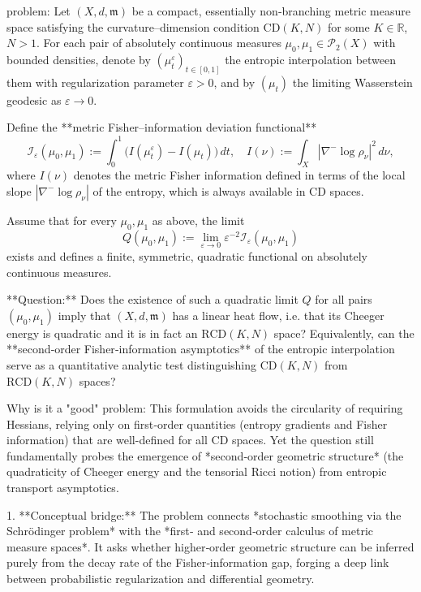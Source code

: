 problem:  
Let \((X,d,\mathfrak{m})\) be a compact, essentially non‑branching metric measure space satisfying the curvature–dimension condition \(\mathrm{CD}(K,N)\) for some \(K\in\mathbb{R}\), \(N>1\).  
For each pair of absolutely continuous measures \(\mu_0,\mu_1\in\mathcal P_2(X)\) with bounded densities, denote by \((\mu_t^\varepsilon)_{t\in[0,1]}\) the entropic interpolation between them with regularization parameter \(\varepsilon>0\), and by \((\mu_t)\) the limiting Wasserstein geodesic as \(\varepsilon\to 0\).  

Define the **metric Fisher–information deviation functional**  
\[
\mathcal{I}_\varepsilon(\mu_0,\mu_1)
:= \int_0^1\!\!\Big(
I(\mu_t^\varepsilon) - I(\mu_t)
\Big)\,dt,
\quad 
I(\nu):=\int_X |\nabla^- \log\rho_\nu|^2\,d\nu,
\]
where \(I(\nu)\) denotes the metric Fisher information defined in terms of the local slope \(|\nabla^- \log\rho_\nu|\) of the entropy, which is always available in CD spaces.  

Assume that for every \(\mu_0,\mu_1\) as above, the limit  
\[
Q(\mu_0,\mu_1):=\lim_{\varepsilon\to0}\varepsilon^{-2}\mathcal{I}_\varepsilon(\mu_0,\mu_1)
\]
exists and defines a finite, symmetric, quadratic functional on absolutely continuous measures.  

**Question:**  
Does the existence of such a quadratic limit \(Q\) for all pairs \((\mu_0,\mu_1)\) imply that \((X,d,\mathfrak{m})\) has a linear heat flow, i.e. that its Cheeger energy is quadratic and it is in fact an \(\mathrm{RCD}(K,N)\) space?  
Equivalently, can the **second‑order Fisher‑information asymptotics** of the entropic interpolation serve as a quantitative analytic test distinguishing \(\mathrm{CD}(K,N)\) from \(\mathrm{RCD}(K,N)\) spaces?  

Why is it a "good" problem:  
This formulation avoids the circularity of requiring Hessians, relying only on first‑order quantities (entropy gradients and Fisher information) that are well-defined for all CD spaces. Yet the question still fundamentally probes the emergence of *second‑order geometric structure* (the quadraticity of Cheeger energy and the tensorial Ricci notion) from entropic transport asymptotics.  

1. **Conceptual bridge:**  
   The problem connects *stochastic smoothing via the Schrödinger problem* with the *first‑ and second‑order calculus of metric measure spaces*. It asks whether higher‑order geometric structure can be inferred purely from the decay rate of the Fisher‑information gap, forging a deep link between probabilistic regularization and differential geometry.  

